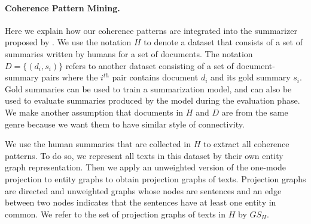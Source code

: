 \paragraph{Coherence Pattern Mining.} 
%
Here we explain how our coherence patterns are integrated into the summarizer proposed by . 
We use the notation $H$ to denote a dataset that consists of a set of summaries written by humans for a set of documents. 
The notation $D=\lbrace \left( d_i, s_i \right) \rbrace$ refers to another dataset consisting of a set of document-summary pairs where the $i^{th}$ pair contains document $d_i$ and  its gold summary $s_i$.  
Gold summaries can be used to train a summarization model, and can also be used to evaluate summaries produced by the model during the evaluation phase. 
We make another assumption that documents in $H$ and $D$ are from the same genre because we want them to have similar style of connectivity. 

We use the human summaries that are collected in $H$ to extract all coherence patterns. 
To do so, we represent all texts in this dataset by their own entity graph representation. 
Then we apply an unweighted version of the one-mode projection to entity graphs to obtain projection graphs of texts. 
Projection graphs are directed and unweighted graphs whose nodes are sentences and an edge between two nodes indicates that the sentences have at least one entity in common. 
We refer to the set of projection graphs of texts in $H$ by $GS_H$. 

